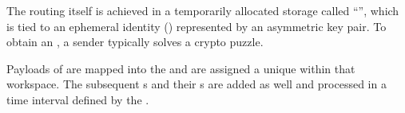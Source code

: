 The routing itself is achieved in a temporarily allocated storage called ``'', which is tied to an ephemeral identity () represented by an asymmetric key pair. To obtain an , a sender typically solves a crypto puzzle. 

Payloads of \VortexMessages{} are mapped into the  and are assigned a unique  within that workspace. The subsequent s and their s are added as well and processed in a time interval defined by the .

